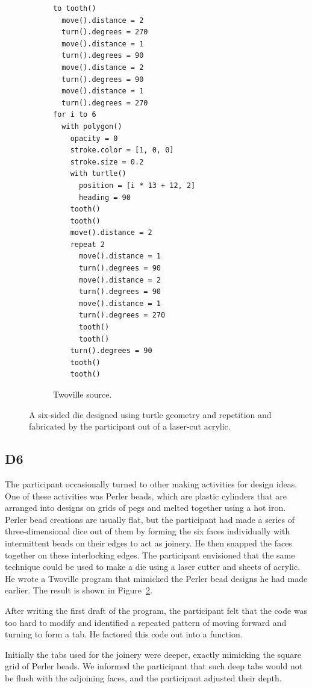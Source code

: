 \begin{figure}
\begin{subfigure}{0.3\linewidth}
\centering
\begin{minipage}{\linewidth}
\small
\begin{Verbatim}
to tooth()
  move().distance = 2
  turn().degrees = 270
  move().distance = 1
  turn().degrees = 90
  move().distance = 2
  turn().degrees = 90
  move().distance = 1
  turn().degrees = 270
for i to 6
  with polygon()
    opacity = 0
    stroke.color = [1, 0, 0]
    stroke.size = 0.2
    with turtle()
      position = [i * 13 + 12, 2]
      heading = 90
    tooth()
    tooth()
    move().distance = 2
    repeat 2
      move().distance = 1
      turn().degrees = 90
      move().distance = 2
      turn().degrees = 90
      move().distance = 1
      turn().degrees = 270
      tooth()
      tooth()
    turn().degrees = 90
    tooth()
    tooth()
\end{Verbatim}
\end{minipage}
\caption{Twoville source.}
\label{figure:d6_program}
\end{subfigure}%
\caption{A six-sided die designed using turtle geometry and repetition and fabricated by the participant out of a laser-cut acrylic.}
\label{figure:d6}
\end{figure}

\subsection{D6}

The participant occasionally turned to other making activities for design ideas. One of these activities was Perler beads, which are plastic cylinders that are arranged into designs on grids of pegs and melted together using a hot iron. Perler bead creations are usually flat, but the participant had made a series of three-dimensional dice out of them by forming the six faces individually with intermittent beads on their edges to act as joinery. He then snapped the faces together on these interlocking edges. The participant envisioned that the same technique could be used to make a die using a laser cutter and sheets of acrylic. He wrote a Twoville program that mimicked the Perler bead designs he had made earlier. The result is shown in Figure~\ref{figure:d6}.

After writing the first draft of the program, the participant felt that the code was too hard to modify and identified a repeated pattern of moving forward and turning to form a tab. He factored this code out into a function.

Initially the tabs used for the joinery were deeper, exactly mimicking the square grid of Perler beads. We informed the participant that such deep tabs would not be flush with the adjoining faces, and the participant adjusted their depth.

